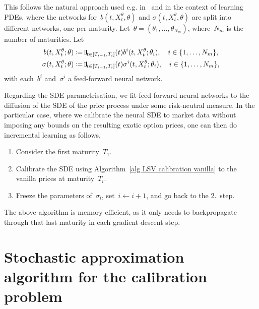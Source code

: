 This follows the natural approach used e.g. in~\cite{Cuchiero2020AModels} and \cite{Vidales2018UnbiasedPDEs} in the context of learning PDEs, where the networks for~$b(t,X_t^{\theta},\theta)$ and 
$\sigma(t,X_t^{\theta},\theta)$ are split into different networks, one
per maturity.
Let~$\theta=(\theta_1,\ldots,\theta_{N_{m}})$, where~$N_m$ is the number of maturities. 
Let 
\begin{equation} 
\label{eq one network per maturity}
\begin{split}
b(t,X_t^{\theta};\theta) & \defEqual  \ind_{t\in[T_{i-1},T_i]}(t)b^i(t,X_t^{\theta};\theta_i), \quad i\in\{1,\ldots,N_{m}\},	\\
\sigma(t,X_t^{\theta};\theta) & \defEqual  \ind_{t\in[T_{i-1},T_i]}(t)\sigma^i(t,X_t^{\theta};\theta_i), \quad i\in\{1,\ldots,N_{m}\},	
\end{split}
\end{equation}
with each~$b^i$ and~$\sigma^i$ a feed-forward neural network. 

\begin{samepage}
Regarding the SDE parametrisation, we fit feed-forward neural networks to the diffusion of the SDE of the price process under some risk-neutral measure. In the particular case, where we calibrate the neural SDE to market data without imposing any bounds on the resulting exotic option prices, one can then do incremental learning as follows,
\begin{enumerate}
	\item Consider the first maturity~$T_1$.
	\item Calibrate the SDE using Algorithm~\ref{alg LSV calibration vanilla} to the vanilla prices at maturity~$T_i$.
	\item Freeze the parameters of~$\sigma_{i}$, set~$i \leftarrow i+1$,
	and go back to the 2.~step.  
\end{enumerate}
\nopagebreak
The above algorithm is memory efficient, as it only needs to backpropagate through that last maturity in each gradient descent step.  
\end{samepage}


\section{Stochastic approximation algorithm for the calibration problem}\label{sec:sgd}


